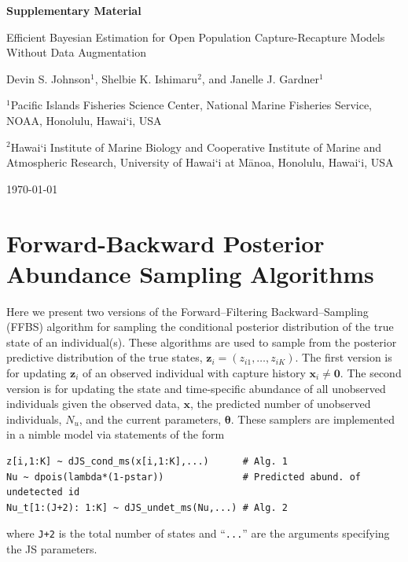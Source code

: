 \documentclass[11pt]{article}
\newcommand{\bx}{\ensuremath{\mathbf{x}}}
\newcommand{\bz}{\ensuremath{\mathbf{z}}}
\newcommand{\bt}{\ensuremath{\boldsymbol{\theta}}}
\begin{document}
\setlength{\parindent}{0pt}
\renewcommand{\baselinestretch}{1.25}\normalsize


{\Large \bf Supplementary Material} \bigskip\bigskip



{\Large Efficient Bayesian Estimation for Open Population Capture-Recapture Models Without Data Augmentation}

\bigskip\bigskip


{Devin S. Johnson$^1$, Shelbie K. Ishimaru$^2$, and Janelle J. Gardner$^1$} \bigskip

$^1$Pacific Islands Fisheries Science Center, National Marine Fisheries Service, NOAA, Honolulu, Hawai`i, USA \bigskip
 
$^2$Hawai`i Institute of Marine Biology and Cooperative Institute of Marine and Atmospheric Research, University of Hawai`i at Mānoa, Honolulu, Hawai`i, USA \bigskip

\today

\clearpage

\raggedright
\setlength{\parindent}{2em}
\raggedbottom



\section{Forward-Backward Posterior Abundance Sampling Algorithms}


Here we present two versions of the Forward--Filtering Backward--Sampling (FFBS) algorithm for sampling the conditional posterior distribution of the true state of an individual(s). These algorithms are used to sample from the posterior predictive distribution of the true states, $\bz_i=(z_{i1},\dots,z_{iK})$. The first version is for updating $\bz_i$ of an observed individual with capture history $\bx_i\ne\mathbf{0}$. The second version is for updating the state and time-specific abundance of all unobserved individuals given the observed data, $\bx$, the predicted number of unobserved individuals, $N_u$, and the current parameters, $\bt$. These samplers are implemented in a nimble model via statements of the form 
\begin{verbatim}
z[i,1:K] ~ dJS_cond_ms(x[i,1:K],...)      # Alg. 1
Nu ~ dpois(lambda*(1-pstar))              # Predicted abund. of undetected id
Nu_t[1:(J+2): 1:K] ~ dJS_undet_ms(Nu,...) # Alg. 2
\end{verbatim}
where {\tt J+2} is the total number of states and ``{\tt ...}'' are the arguments specifying the JS parameters. 
\end{document}
